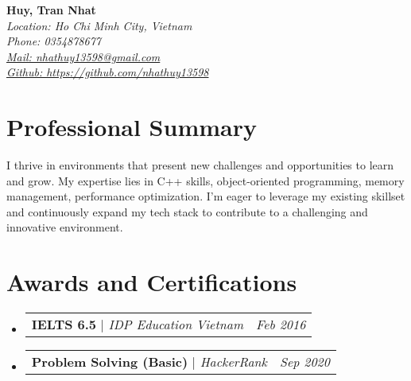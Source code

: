 \documentclass[letterpaper,1pt]{article}
\makeatletter
\newcommand{\sectionspace}{
\vspace{-20pt}
}
\newcommand{\subheadingtitlevspace}{
\vspace{-3pt}
}
\newcommand{\titleItem}[1]{
  \large\textbf{#1}
}
\newcommand{\resumeProjectHeading}[2]{
    \item
    \begin{tabular*}{0.97\textwidth}{l@{\extracolsep{\fill}}r}
      #1 & \textit{\large #2} \\
    \end{tabular*}\vspace{-9pt}
}
\newcommand{\resumeSubHeadingListStart}{\subheadingtitlevspace\begin{itemize}[leftmargin=0.15in, label={}]}
\newcommand{\resumeSubHeadingListEnd}{\end{itemize}}
\makeatother
\begin{document}

\begin{flushleft}
    \textbf{\huge Huy, Tran Nhat} \\    
    \textit{Location: Ho Chi Minh City, Vietnam} \\
    \textit{Phone: 0354878677} \\ 
    \href{mailto:nhathuy13598@gmail.com}{{\textit{Mail: nhathuy13598@gmail.com}}} \\
    \href{https://github.com/nhathuy13598}{{\textit{Github: https://github.com/nhathuy13598}}}
    \vspace{-8pt}
\end{flushleft}



\section{Professional Summary}
\vspace{-3pt}
\begin{itemize}[leftmargin=0.15in, label={}]
    {\item{
     {\large I thrive in environments that present new challenges and opportunities to learn and grow. My expertise lies in C++ skills, object-oriented programming, memory management, performance optimization. I'm eager to leverage my existing skillset and continuously expand my tech stack to contribute to a challenging and innovative environment.} \\      
    }}
 \end{itemize}
 \sectionspace



\section{Awards and Certifications}
    \resumeSubHeadingListStart
      \resumeProjectHeading
          {\titleItem{IELTS 6.5} \emph{ $|$ IDP Education Vietnam}}{Feb 2016}
      \resumeProjectHeading
          {\titleItem{Problem Solving (Basic)} \emph{ $|$ HackerRank}}{Sep 2020}
    \resumeSubHeadingListEnd
\end{document}

